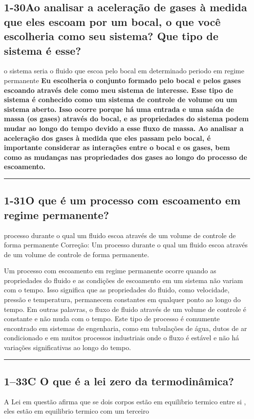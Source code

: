 \documentclass{article}
\begin{document}
\subsection*{1-30Ao analisar a aceleração de gases à medida que eles escoam por um bocal, o que você escolheria como seu sistema? Que tipo de sistema é esse?}
o sistema seria o fluido que escoa pelo bocal em determinado periodo em regime permanente
\textbf{Eu escolheria o conjunto formado pelo bocal e pelos gases escoando através dele como meu sistema de interesse. Esse tipo de sistema é conhecido como um sistema de controle de volume ou um sistema aberto. Isso ocorre porque há uma entrada e uma saída de massa (os gases) através do bocal, e as propriedades do sistema podem mudar ao longo do tempo devido a esse fluxo de massa. Ao analisar a aceleração dos gases à medida que eles passam pelo bocal, é importante considerar as interações entre o bocal e os gases, bem como as mudanças nas propriedades dos gases ao longo do processo de escoamento.
}\\
\noindent\rule{\textwidth}{0.4pt}
\subsection*{1-31O que é um processo com escoamento em regime permanente?}
processo durante o qual um fluido escoa através de um volume de controle de forma permanente 
Correção: Um processo durante o qual um fluido escoa através de um volume de controle de forma permanente.

Um processo com escoamento em regime permanente ocorre quando as propriedades do fluido e as condições de escoamento em um sistema não variam com o tempo. Isso significa que as propriedades do fluido, como velocidade, pressão e temperatura, permanecem constantes em qualquer ponto ao longo do tempo. Em outras palavras, o fluxo de fluido através de um volume de controle é constante e não muda com o tempo. Este tipo de processo é comumente encontrado em sistemas de engenharia, como em tubulações de água, dutos de ar condicionado e em muitos processos industriais onde o fluxo é estável e não há variações significativas ao longo do tempo.\\
\noindent\rule{\textwidth}{0.4pt}
\subsection*{1–33C O que é a lei zero da termodinâmica?}
A Lei em questão afirma que se dois corpos estão em equilibrio termico entre si , eles estão em equilibrio termico com um terceiro
\end{document}
